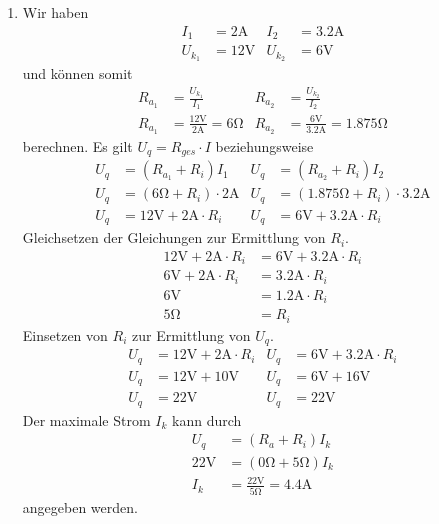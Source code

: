 \documentclass{article}
\begin{document}
\begin{enumerate}
    \item Wir haben
    \begin{align*}
        I_1 &= \num{2}\si{\ampere} & I_2 &= \num{3.2}\si{\ampere} \\
        U_{k_1} &= 12\si{\volt} & U_{k_2} &= 6\si{\volt}
    \end{align*}
    und k\"onnen somit
    \begin{align*}
        R_{a_1} &= \frac{U_{k_1}}{I_1} & R_{a_2} &= \frac{U_{k_2}}{I_2} \\
        R_{a_1} &= \frac{12\si{\volt}}{\num{2}\si{\ampere}} = 6\si{\ohm} & R_{a_2} &= \frac{6\si{\volt}}{\num{3.2}\si{\ampere}} = \num{1.875}\si{\ohm}
    \end{align*}
    berechnen. Es gilt $U_q = R_{ges} \cdot I$ beziehungsweise
    \begin{align*}
        U_q &= (R_{a_1} + R_i)I_1 & U_q &= (R_{a_2} + R_i)I_2 \\
        U_q &= (6\si{\ohm}+ R_i) \cdot \num{2}\si{\ampere} & U_q &= (\num{1.875}\si{\ohm}+ R_i) \cdot \num{3.2}\si{\ampere} \\
        U_q &= 12\si{\volt} + 2\si{\ampere} \cdot R_i & U_q &= 6\si{\volt} + \num{3.2}\si{\ampere} \cdot R_i
    \end{align*}
    Gleichsetzen der Gleichungen zur Ermittlung von $R_i$.
    \begin{align*}
        12\si{\volt} + 2\si{\ampere} \cdot R_i &= 6\si{\volt} + \num{3.2}\si{\ampere} \cdot R_i \\
        6\si{\volt} + 2\si{\ampere} \cdot R_i &= \num{3.2}\si{\ampere} \cdot R_i \\
        6\si{\volt} &= \num{1.2}\si{\ampere} \cdot R_i \\
        5\si{\ohm} &= R_i
    \end{align*}
    Einsetzen von $R_i$ zur Ermittlung von $U_q$.
    \begin{align*}
        U_q &= 12\si{\volt} + 2\si{\ampere} \cdot R_i & U_q &= 6\si{\volt} + \num{3.2}\si{\ampere} \cdot R_i \\
        U_q &= 12\si{\volt} + 10\si{\volt} & U_q &= 6\si{\volt} + 16\si{\volt} \\
        U_q &= 22\si{\volt} & U_q &= 22\si{\volt}
    \end{align*}
    Der maximale Strom $I_k$ kann durch
    \begin{align*}
        U_q &= (R_a + R_i)I_k \\
        22\si{\volt} &= (0\si{\ohm} + 5\si{\ohm})I_k \\
        I_k &= \frac{22\si{\volt}}{5\si{\ohm}} = \num{4.4}\si{\ampere}
    \end{align*}
    angegeben werden.
\end{enumerate}
\end{document}
